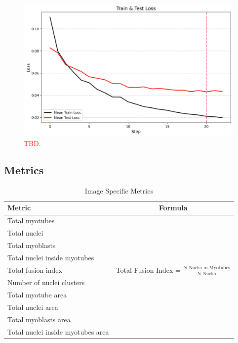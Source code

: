 \begin{figure}
	\centering
	\includegraphics[width=\textwidth]{"images/train_test_loss.png"}
	\caption[Train and Test loss]{\textcolor{red}{TBD}.}
	\label{figtraintestloss}
\end{figure}
\subsection{Metrics}\label{secmetrics}
\begin{table}[H]
	\centering
	\caption{Image Specific Metrics}
	\begin{tabular}{|l|c|}
		\hline
		Metric & Formula \\
		\hline
		Total myotubes &  \\
		\hline
		Total nuclei &  \\
		\hline
		Total myoblasts &  \\
		\hline
		Total nuclei inside myotubes &  \\
		\hline
		Total fusion index & Total Fusion Index = $\frac{\text{N Nuclei in Myotubes}}{\text{N Nuclei}}$ \\
		\hline
		Number of nuclei clusters &  \\
		\hline
		Total myotube area &  \\
		\hline
		Total nuclei area &  \\
		\hline
		Total myoblasts area &  \\
		\hline
		Total nuclei inside myotubes area &  \\
		\hline
	\end{tabular}
\end{table}

